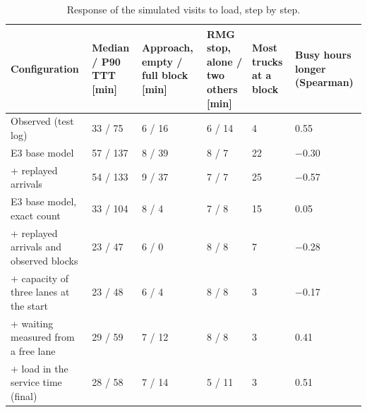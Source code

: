 \begin{table}[htbp]
\centering
\footnotesize
\setlength{\tabcolsep}{3pt}
\begin{tabularx}{\textwidth}{L{4.6cm}YYYYY}
\toprule
\textbf{Configuration} & \textbf{Median / P90 TTT [min]} & \textbf{Approach, empty / full block [min]} & \textbf{RMG stop, alone / two others [min]} & \textbf{Most trucks at a block} & \textbf{Busy hours longer (Spearman)} \\
\midrule
Observed (test log) & 33 / 75 & 6 / 16 & 6 / 14 & 4 & 0.55 \\
\midrule
E3 base model & 57 / 137 & 8 / 39 & 8 / 7 & 22 & $-$0.30 \\
+ replayed arrivals & 54 / 133 & 9 / 37 & 7 / 7 & 25 & $-$0.57 \\
\midrule
E3 base model, exact count & 33 / 104 & 8 / 4 & 7 / 8 & 15 & 0.05 \\
+ replayed arrivals and observed blocks & 23 / 47 & 6 / 0 & 8 / 8 & 7 & $-$0.28 \\
+ capacity of three lanes at the start & 23 / 48 & 6 / 4 & 8 / 8 & 3 & $-$0.17 \\
+ waiting measured from a free lane & 29 / 59 & 7 / 12 & 8 / 8 & 3 & 0.41 \\
+ load in the service time (final) & 28 / 58 & 7 / 14 & 5 / 11 & 3 & 0.51 \\
\bottomrule
\end{tabularx}
\par{}
\caption{Response of the simulated visits to load, step by step.}
\label{tab:rq2_responses}
\end{table}
